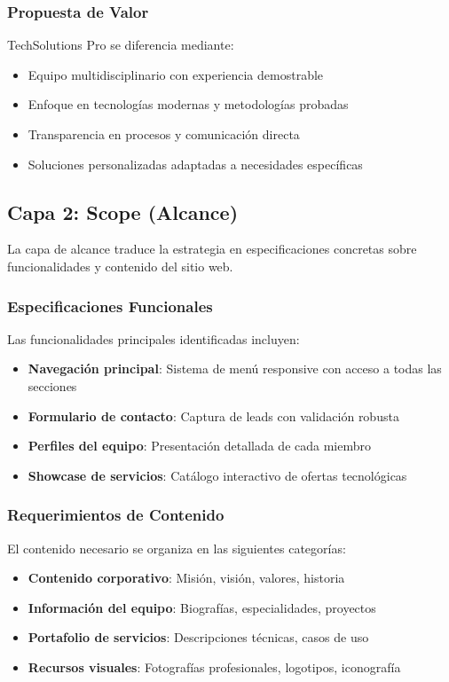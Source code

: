 \subsubsection{Propuesta de Valor}
TechSolutions Pro se diferencia mediante:

\begin{itemize}
    \item Equipo multidisciplinario con experiencia demostrable
    \item Enfoque en tecnologías modernas y metodologías probadas
    \item Transparencia en procesos y comunicación directa
    \item Soluciones personalizadas adaptadas a necesidades específicas
\end{itemize}

\subsection{Capa 2: Scope (Alcance)}

La capa de alcance traduce la estrategia en especificaciones concretas sobre funcionalidades y contenido del sitio web.

\subsubsection{Especificaciones Funcionales}
Las funcionalidades principales identificadas incluyen:

\begin{itemize}
    \item \textbf{Navegación principal}: Sistema de menú responsive con acceso a todas las secciones
    \item \textbf{Formulario de contacto}: Captura de leads con validación robusta
    \item \textbf{Perfiles del equipo}: Presentación detallada de cada miembro
    \item \textbf{Showcase de servicios}: Catálogo interactivo de ofertas tecnológicas
\end{itemize}

\subsubsection{Requerimientos de Contenido}
El contenido necesario se organiza en las siguientes categorías:

\begin{itemize}
    \item \textbf{Contenido corporativo}: Misión, visión, valores, historia
    \item \textbf{Información del equipo}: Biografías, especialidades, proyectos
    \item \textbf{Portafolio de servicios}: Descripciones técnicas, casos de uso
    \item \textbf{Recursos visuales}: Fotografías profesionales, logotipos, iconografía
\end{itemize}


